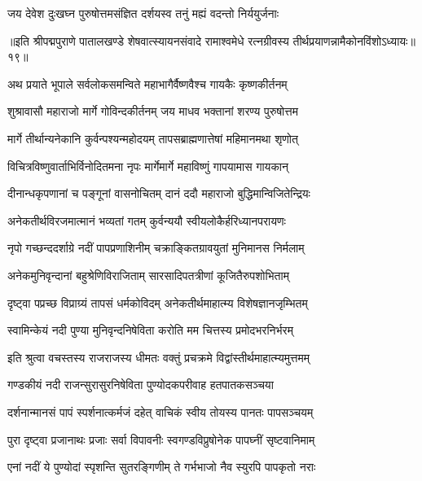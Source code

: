 \twolineshloka
{जय देवेश दुःखघ्न पुरुषोत्तमसंज्ञित}
{दर्शयस्व तनुं मह्यं वदन्तो निर्ययुर्जनाः}%

॥इति श्रीपद्मपुराणे पातालखण्डे शेषवात्स्यायनसंवादे रामाश्वमेधे रत्नग्रीवस्य तीर्थप्रयाणन्नामैकोनविंशोऽध्यायः॥१९॥



\twolineshloka
{अथ प्रयाते भूपाले सर्वलोकसमन्विते}
{महाभागैर्वैष्णवैश्च गायकैः कृष्णकीर्तनम्}%

\twolineshloka
{शुश्रावासौ महाराजो मार्गे गोविन्दकीर्तनम्}
{जय माधव भक्तानां शरण्य पुरुषोत्तम}%

\twolineshloka
{मार्गे तीर्थान्यनेकानि कुर्वन्पश्यन्महोदयम्}
{तापसब्राह्मणात्तेषां महिमानमथा शृणोत्}%

\twolineshloka
{विचित्रविष्णुवार्ताभिर्विनोदितमना नृपः}
{मार्गेमार्गे महाविष्णुं गापयामास गायकान्}%

\twolineshloka
{दीनान्धकृपणानां च पङ्गूनां वासनोचितम्}
{दानं ददौ महाराजो बुद्धिमान्विजितेन्द्रियः}%

\twolineshloka
{अनेकतीर्थविरजमात्मानं भव्यतां गतम्}
{कुर्वन्ययौ स्वीयलोकैर्हरिध्यानपरायणः}%

\twolineshloka
{नृपो गच्छन्ददर्शाग्रे नदीं पापप्रणाशिनीम्}
{चक्राङ्कितग्रावयुतां मुनिमानस निर्मलाम्}%

\twolineshloka
{अनेकमुनिवृन्दानां बहुश्रेणिविराजिताम्}
{सारसादिपतत्रीणां कूजितैरुपशोभिताम्}%

\twolineshloka
{दृष्ट्वा पप्रच्छ विप्राग्र्यं तापसं धर्मकोविदम्}
{अनेकतीर्थमाहात्म्य विशेषज्ञानजृम्भितम्}%

\twolineshloka
{स्वामिन्केयं नदी पुण्या मुनिवृन्दनिषेविता}
{करोति मम चित्तस्य प्रमोदभरनिर्भरम्}%

\twolineshloka
{इति श्रुत्वा वचस्तस्य राजराजस्य धीमतः}
{वक्तुं प्रचक्रमे विद्वांस्तीर्थमाहात्म्यमुत्तमम्}%


\twolineshloka
{गण्डकीयं नदी राजन्सुरासुरनिषेविता}
{पुण्योदकपरीवाह हतपातकसञ्चया}%

\twolineshloka
{दर्शनान्मानसं पापं स्पर्शनात्कर्मजं दहेत्}
{वाचिकं स्वीय तोयस्य पानतः पापसञ्चयम्}%

\twolineshloka
{पुरा दृष्ट्वा प्रजानाथः प्रजाः सर्वा विपावनीः}
{स्वगण्डविप्रुषोनेक पापघ्नीं सृष्टवानिमाम्}%

\twolineshloka
{एनां नदीं ये पुण्योदां स्पृशन्ति सुतरङ्गिणीम्}
{ते गर्भभाजो नैव स्युरपि पापकृतो नराः}%

